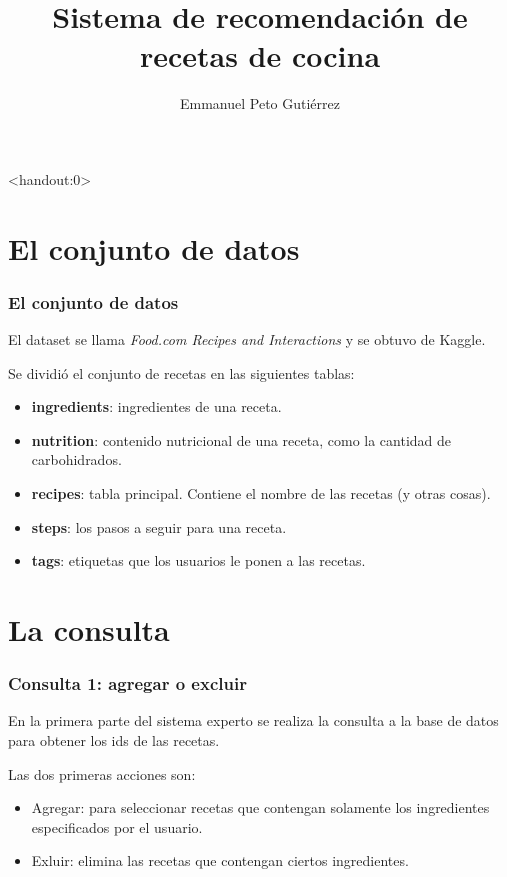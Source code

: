 \documentclass[11pt, aspectratio=169]{beamer}
\title{Sistema de recomendación de recetas de cocina}
\author{Emmanuel Peto Gutiérrez}
\institute{IIMAS \\ UNAM}
\begin{document}
\begin{frame}<handout:0>
\titlepage
\end{frame}

\section{El conjunto de datos}

\begin{frame}
\frametitle{El conjunto de datos}

El dataset se llama \textit{Food.com Recipes and Interactions} y se obtuvo de Kaggle.

Se dividió el conjunto de recetas en las siguientes tablas:

\begin{itemize}
\item \textbf{ingredients}: ingredientes de una receta.
\item \textbf{nutrition}: contenido nutricional de una receta, como la cantidad de carbohidrados.
\item \textbf{recipes}: tabla principal. Contiene el nombre de las recetas (y otras cosas).
\item \textbf{steps}: los pasos a seguir para una receta.
\item \textbf{tags}: etiquetas que los usuarios le ponen a las recetas.
\end{itemize}

\end{frame}

\section{La consulta}

\begin{frame}
\frametitle{Consulta 1: agregar o excluir}

En la primera parte del sistema experto se realiza la consulta a la base de datos para obtener los ids de las recetas.

Las dos primeras acciones son:
\begin{itemize}
\item Agregar: para seleccionar recetas que contengan solamente los ingredientes especificados por el usuario.
\item Exluir: elimina las recetas que contengan ciertos ingredientes.
\end{itemize}

\end{frame}
\end{document}

